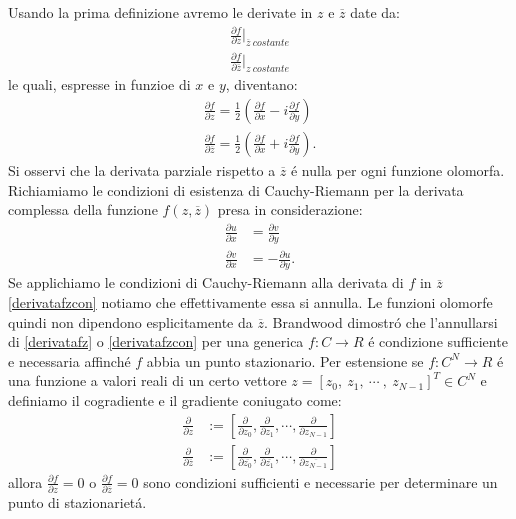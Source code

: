 \documentclass[a4paper,12pt]{report}
\begin{document}
 Usando la prima definizione avremo le derivate in $z$ e $\overline{z}$ date da:
 \begin{align}
  \frac{\partial f}{\partial z}\bigg|_{\overline{z} \ costante}\\
  \frac{\partial f}{\partial \overline{z}}\bigg|_{z \ costante}
 \end{align}
 le quali, espresse in funzioe di $x$ e $y$, diventano:
 \begin{align}
  \frac{\partial f}{\partial z} = \frac{1}{2}\left(\frac{\partial f}{\partial x}-i\frac{\partial f}{\partial y}\right)\label{derivatafz}\\
  \frac{\partial f}{\partial \overline{z}} = \frac{1}{2}\left(\frac{\partial f}{\partial x}+i\frac{\partial f}{\partial y}\right).\label{derivatafzcon}
 \end{align}
 Si osservi che la derivata parziale rispetto a $\overline{z}$ \'e nulla per ogni funzione olomorfa. 
 Richiamiamo le condizioni di esistenza di Cauchy-Riemann per la derivata complessa della funzione $f(z,\overline{z})$ presa in considerazione:
 \begin{align}
  \frac{\partial u}{\partial x} &= \frac{\partial v}{\partial y}\\
  \frac{\partial v}{\partial x} &=- \frac{\partial u}{\partial y}.
 \end{align}
 Se applichiamo le condizioni di Cauchy-Riemann alla derivata di $f$ in $\overline{z}$ \ref{derivatafzcon} notiamo che effettivamente essa si annulla. 
 Le funzioni olomorfe quindi non dipendono esplicitamente da $\overline{z}$. 
 Brandwood dimostr\'o che l'annullarsi di \ref{derivatafz} o \ref{derivatafzcon} per una generica $f:C\rightarrow R$ \'e condizione sufficiente e necessaria affinch\'e $f$ abbia un punto stazionario. 
 Per estensione se $f:C^N\rightarrow R$ \'e una funzione a valori reali di un certo vettore $z=\left[ z_0, \ z_1, \ \cdots \ , \ z_{N-1}\right]^T \in C^N$ e definiamo il cogradiente e il gradiente coniugato come:
 \begin{align}
  \frac{\partial}{\partial z} &:=\left[ \frac{\partial}{\partial z_0},\frac{\partial}{\partial z_1},\cdots ,\frac{\partial}{\partial z_{N-1}}\right]\\
  \frac{\partial}{\partial \overline{z}} &:=\left[ \frac{\partial}{\partial \overline{z_0}},\frac{\partial}{\partial \overline{z_1}},\cdots ,\frac{\partial}{\partial \overline{z_{N-1}}}\right]
 \end{align}
 allora $\frac{\partial f}{\partial z}=0$ o $\frac{\partial f}{\partial \overline{z}}=0$ sono condizioni sufficienti e necessarie per determinare un punto di stazionariet\'a. 
\end{document}
